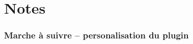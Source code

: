 \documentclass[11pt]{article}
\begin{document}
\vspace*{0.2em}
\section*{Notes}
\hrulefill
\vspace*{1.6em}

\hrulefill
\vspace*{1.6em}

\hrulefill
\vspace*{1.6em}

\hrulefill
\vspace*{1.6em}


\hrulefill
\vspace*{1.6em}

\hrulefill
\vspace*{1.6em}




\newpage{}
\subsubsection{Marche à suivre \--- personalisation du plugin}
\end{document}
